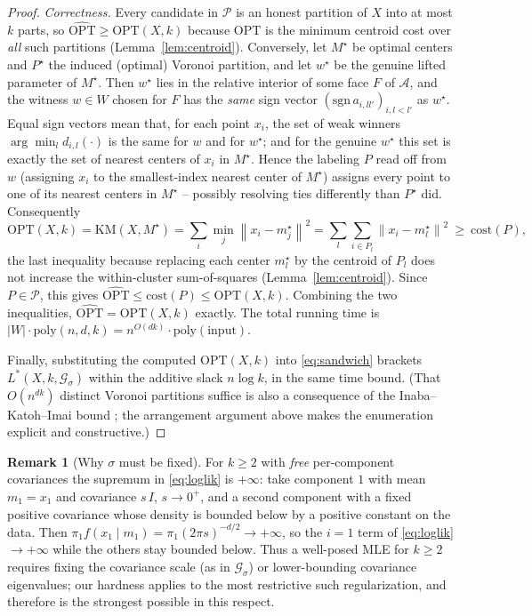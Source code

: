 \documentclass{amsart}
\theoremstyle{plain}
\theoremstyle{definition}
\newtheorem{remark}{Remark}
\newcommand{\norm}[1]{\left\lVert #1 \right\rVert}
\begin{document}
\begin{proof}
\emph{Correctness.} Every candidate in $\mathcal P$ is an honest partition of $X$
into at most $k$ parts, so $\widehat{\mathrm{OPT}}\ge\mathrm{OPT}(X,k)$ because
$\mathrm{OPT}$ is the minimum centroid cost over \emph{all} such partitions
(Lemma~\ref{lem:centroid}). Conversely, let $M^{\star}$ be optimal centers and
$P^{\star}$ the induced (optimal) Voronoi partition, and let $w^{\star}$ be the
genuine lifted parameter of $M^{\star}$. Then $w^{\star}$ lies in the relative
interior of some face $F$ of $\mathcal A$, and the witness $w\in W$ chosen for $F$
has the \emph{same} sign vector $(\mathrm{sgn}\,a_{i,ll'})_{i,l<l'}$ as
$w^{\star}$. Equal sign vectors mean that, for each point $x_i$, the set of weak
winners $\arg\min_l d_{i,l}(\cdot)$ is the same for $w$ and for $w^{\star}$; and for
the genuine $w^{\star}$ this set is exactly the set of nearest centers of $x_i$ in
$M^{\star}$. Hence the labeling $P$ read off from $w$ (assigning $x_i$ to the
smallest-index nearest center of $M^{\star}$) assigns every point to one of its
nearest centers in $M^{\star}$ -- possibly resolving ties differently than
$P^{\star}$ did. Consequently
\[
\mathrm{OPT}(X,k)=\mathrm{KM}(X,M^{\star})=\sum_{i}\min_{j}\norm{x_i-m_j^{\star}}^2
=\sum_{l}\sum_{i\in P_l}\norm{x_i-m_l^{\star}}^2\ \ge\ \mathrm{cost}(P),
\]
the last inequality because replacing each center $m_l^{\star}$ by the centroid of
$P_l$ does not increase the within-cluster sum-of-squares (Lemma~\ref{lem:centroid}).
Since $P\in\mathcal P$, this gives $\widehat{\mathrm{OPT}}\le\mathrm{cost}(P)\le
\mathrm{OPT}(X,k)$. Combining the two inequalities, $\widehat{\mathrm{OPT}}=
\mathrm{OPT}(X,k)$ exactly. The total running time is
$|W|\cdot\mathrm{poly}(n,d,k)=n^{O(dk)}\cdot\mathrm{poly}(\text{input})$.

Finally, substituting the computed $\mathrm{OPT}(X,k)$ into \eqref{eq:sandwich}
brackets $L^{\ast}(X,k,\mathcal G_{\sigma})$ within the additive slack $n\log k$,
in the same time bound. (That $O(n^{dk})$ distinct Voronoi partitions suffice is
also a consequence of the Inaba--Katoh--Imai bound \cite{IKI}; the arrangement
argument above makes the enumeration explicit and constructive.)
\end{proof}

\begin{remark}[Why $\sigma$ must be fixed]\label{rem:degen}
For $k\ge2$ with \emph{free} per-component covariances the supremum in
\eqref{eq:loglik} is $+\infty$: take component $1$ with mean $m_{1}=x_{1}$ and
covariance $s\,I$, $s\to0^{+}$, and a second component with a fixed positive
covariance whose density is bounded below by a positive constant on the data.
Then $\pi_{1}f(x_{1}\mid m_{1})=\pi_{1}(2\pi s)^{-d/2}\to+\infty$, so the
$i=1$ term of \eqref{eq:loglik} $\to+\infty$ while the others stay bounded below.
Thus a well-posed MLE for $k\ge2$ requires fixing the covariance scale (as in
$\mathcal G_{\sigma}$) or lower-bounding covariance eigenvalues; our hardness
applies to the most restrictive such regularization, and therefore is the
strongest possible in this respect.
\end{remark}
\end{document}
